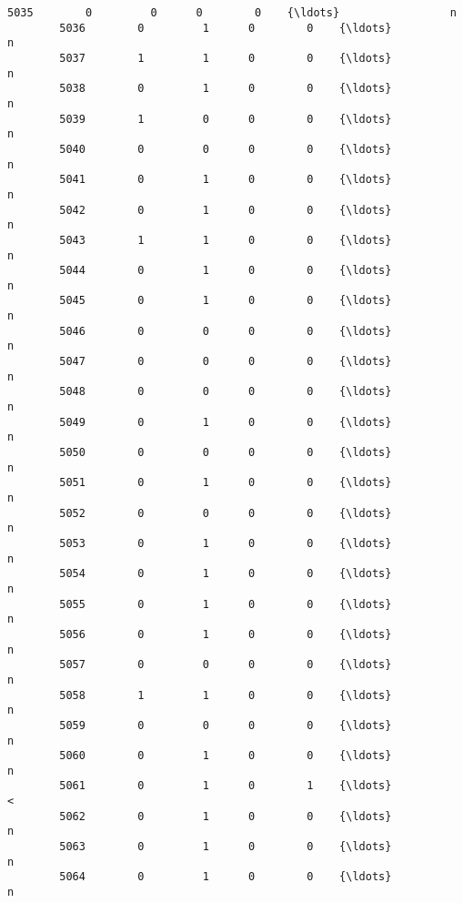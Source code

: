 \documentclass[11pt]{article}
\begin{document}
\begin{Verbatim}[commandchars=\\\{\}]
        5035        0         0      0        0    {\ldots}                 n   
        5036        0         1      0        0    {\ldots}                 n   
        5037        1         1      0        0    {\ldots}                 n   
        5038        0         1      0        0    {\ldots}                 n   
        5039        1         0      0        0    {\ldots}                 n   
        5040        0         0      0        0    {\ldots}                 n   
        5041        0         1      0        0    {\ldots}                 n   
        5042        0         1      0        0    {\ldots}                 n   
        5043        1         1      0        0    {\ldots}                 n   
        5044        0         1      0        0    {\ldots}                 n   
        5045        0         1      0        0    {\ldots}                 n   
        5046        0         0      0        0    {\ldots}                 n   
        5047        0         0      0        0    {\ldots}                 n   
        5048        0         0      0        0    {\ldots}                 n   
        5049        0         1      0        0    {\ldots}                 n   
        5050        0         0      0        0    {\ldots}                 n   
        5051        0         1      0        0    {\ldots}                 n   
        5052        0         0      0        0    {\ldots}                 n   
        5053        0         1      0        0    {\ldots}                 n   
        5054        0         1      0        0    {\ldots}                 n   
        5055        0         1      0        0    {\ldots}                 n   
        5056        0         1      0        0    {\ldots}                 n   
        5057        0         0      0        0    {\ldots}                 n   
        5058        1         1      0        0    {\ldots}                 n   
        5059        0         0      0        0    {\ldots}                 n   
        5060        0         1      0        0    {\ldots}                 n   
        5061        0         1      0        1    {\ldots}                 <   
        5062        0         1      0        0    {\ldots}                 n   
        5063        0         1      0        0    {\ldots}                 n   
        5064        0         1      0        0    {\ldots}                 n   
        

\end{Verbatim}
\end{document}
